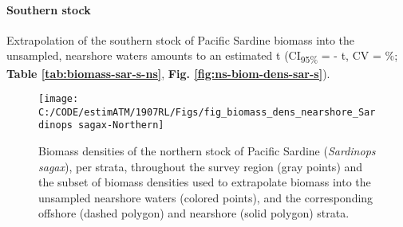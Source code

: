 \documentclass[]{article}
\let\oldparagraph\paragraph
\renewcommand{\paragraph}[1]{\oldparagraph{#1}\mbox{}}
\begin{document}
\begin{table}[!h]

\caption{\label{tab:biomass-sar-n-ns}Biomass estimates (metric tons, t) and their precision (upper and lower 95\% confidence intervals, CI\textsubscript{95\%}; standard deviation, SD; and coefficient of variation, CV) for the northern stock of Pacific Sardine (\emph{Sardinops sagax}) in the unsampled, nearshore waters. Stratum areas are nmi\textsuperscript{2}.}
\centering
{}
\end{table}

\hypertarget{appendix-nearshore-biomass-sardine-s}{%
\paragraph{Southern stock}\label{appendix-nearshore-biomass-sardine-s}}

Extrapolation of the southern stock of Pacific Sardine biomass into the unsampled, nearshore waters amounts to an estimated t (CI\textsubscript{95\%} = - t, CV = \%; \textbf{Table \ref{tab:biomass-sar-s-ns}}, \textbf{Fig. \ref{fig:ns-biom-dens-sar-s}}).



\newpage



\begin{figure}[H]

{\centering \texttt{[image: C:/CODE/estimATM/1907RL/Figs/fig\_biomass\_dens\_nearshore\_Sardinops sagax-Northern]} 

}

\caption{Biomass densities of the northern stock of Pacific Sardine (\emph{Sardinops sagax}), per strata, throughout the survey region (gray points) and the subset of biomass densities used to extrapolate biomass into the unsampled nearshore waters (colored points), and the corresponding offshore (dashed polygon) and nearshore (solid polygon) strata.}\label{fig:ns-biom-dens-sar-n}
\end{figure}
\end{document}

